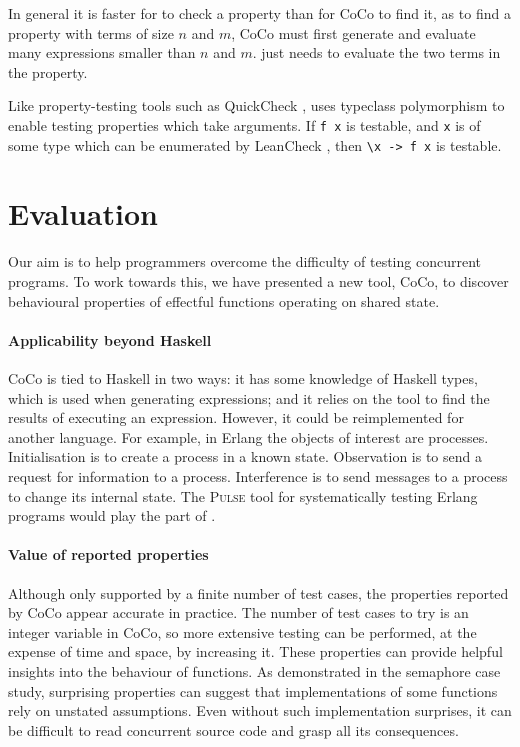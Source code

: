 In general it is faster for \dejafu{} to check a property than for
CoCo to find it, as to find a property with terms of size $n$ and $m$,
CoCo must first generate and evaluate many expressions smaller than
$n$ and $m$.  \dejafu{} just needs to evaluate the two terms in the
property.

Like property-testing tools such as QuickCheck \parencite{claessen2000},
\dejafu{} uses typeclass polymorphism to enable testing properties
which take arguments.  If \texttt{f x} is testable, and \texttt{x} is
of some type which can be enumerated by LeanCheck \parencite{leancheck},
then \verb|\x -> f x| is testable.

\section{Evaluation}
\label{sec:coco-conclusions}

Our aim is to help programmers overcome the difficulty of testing
concurrent programs.  To work towards this, we have presented a new
tool, CoCo, to discover behavioural properties of effectful functions
operating on shared state.

\paragraph{Applicability beyond Haskell}
CoCo is tied to Haskell in two ways: it has some knowledge of Haskell
types, which is used when generating expressions; and it relies on the
\dejafu{} tool to find the results of executing an expression.
However, it could be reimplemented for another language.  For example,
in Erlang the objects of interest are processes.  Initialisation is to
create a process in a known state.  Observation is to send a request
for information to a process.  Interference is to send messages to a
process to change its internal state.  The \textsc{Pulse} tool for
systematically testing Erlang programs \parencite{claessen2009} would play
the part of \dejafu{}.

\paragraph{Value of reported properties}
Although only supported by a finite number of test cases, the
properties reported by CoCo appear accurate in practice.  The number
of test cases to try is an integer variable in CoCo, so more extensive
testing can be performed, at the expense of time and space, by
increasing it.  These properties can provide helpful insights into the
behaviour of functions.  As demonstrated in the semaphore case study,
surprising properties can suggest that implementations of some
functions rely on unstated assumptions.  Even without such
implementation surprises, it can be difficult to read concurrent
source code and grasp all its consequences.

